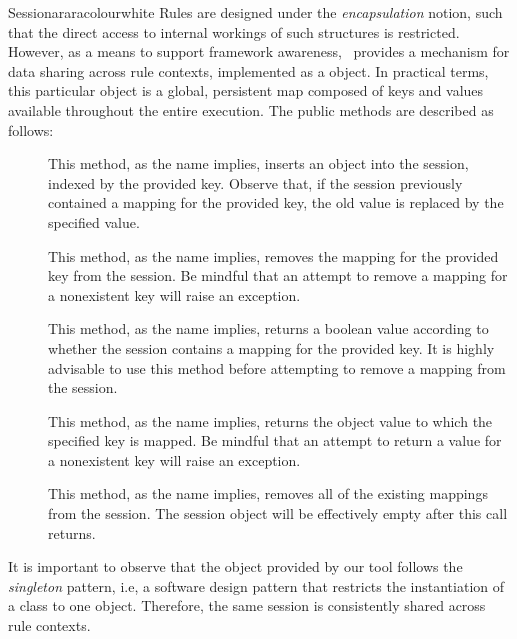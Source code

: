 \begin{messagebox}{Session}{araracolour}{\icok}{white}
Rules are designed under the \emph{encapsulation} notion, such that the direct access to internal workings of such structures is restricted. However, as a means to support framework awareness, \arara\ provides a mechanism for data sharing across rule contexts, implemented as a  object. In practical terms, this particular object is a global, persistent map composed of  keys and  values available throughout the entire execution. The public methods are described as follows:

\begin{description}
\item[\hfill{}] This method, as the name implies, inserts an object into the session, indexed by the provided key. Observe that, if the session previously contained a mapping for the provided key, the old value is replaced by the specified value.

\item[\hfill{}] This method, as the name implies, removes  the mapping for the provided key from the session. Be mindful that an attempt to remove a mapping for a nonexistent key will raise an exception.

\item[\hfill{}] This method, as the name implies, returns a boolean value according to whether the session contains a mapping for the provided key. It is highly advisable to use this method before attempting to remove a mapping from the session.

\item[\hfill{}] This method, as the name implies, returns the object value to which the specified key is mapped. Be mindful that an attempt to return a value for a nonexistent key will raise an exception.

\item[\hfill{}] This method, as the name implies, removes all of the existing mappings from the session. The session object will be effectively empty after this call returns.
\end{description}

It is important to observe that the  object provided by our tool follows the \emph{singleton} pattern, i.e, a software design pattern that restricts the instantiation of a class to one object. Therefore, the same session is consistently shared across rule contexts.
\end{messagebox}

